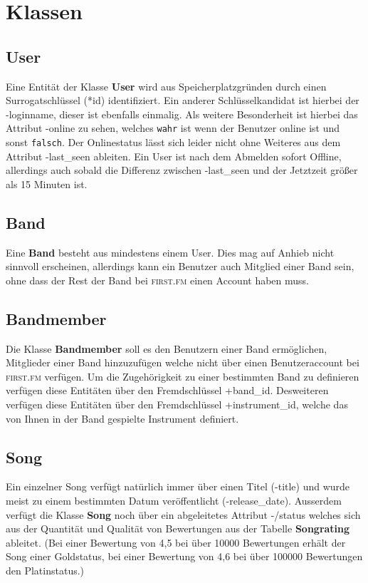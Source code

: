 \documentclass[11pt,a4paper,DIV=9]{scrartcl}
\begin{document}
\section{Klassen}
  \subsection{User}
    Eine Entität der Klasse \textbf{User} wird aus Speicherplatzgründen durch einen Surrogatschlüssel (*id) identifiziert. Ein anderer Schlüsselkandidat ist hierbei der -loginname, dieser ist ebenfalls einmalig. Als weitere Besonderheit ist hierbei das Attribut -online zu sehen, welches \texttt{wahr} ist wenn der Benutzer online ist und sonst \texttt{falsch}. Der Onlinestatus lässt sich leider nicht ohne Weiteres aus dem Attribut -last\_seen ableiten. Ein User ist nach dem Abmelden sofort Offline, allerdings auch sobald die Differenz zwischen -last\_seen und der Jetztzeit größer als 15 Minuten ist.
  \subsection{Band}
    Eine \textbf{Band} besteht aus mindestens einem User. Dies mag auf Anhieb nicht sinnvoll erscheinen, allerdings kann ein Benutzer auch Mitglied einer Band sein, ohne dass der Rest der Band bei \textsc{first.fm} einen Account haben muss. 
  \subsection{Bandmember}
    Die Klasse \textbf{Bandmember} soll es den Benutzern einer Band ermöglichen, Mitglieder einer Band hinzuzufügen welche nicht über einen Benutzeraccount bei \textsc{first.fm} verfügen. Um die Zugehörigkeit zu einer bestimmten Band zu definieren verfügen diese Entitäten über den Fremdschlüssel +band\_id. Desweiteren verfügen diese Entitäten über den Fremdschlüssel +instrument\_id, welche das von Ihnen in der Band gespielte Instrument definiert.
  \subsection{Song}
    Ein einzelner Song verfügt natürlich immer über einen Titel (-title) und wurde meist zu einem bestimmten Datum veröffentlicht (-release\_date). Ausserdem verfügt die Klasse \textbf{Song} noch über ein abgeleitetes Attribut -/status welches sich aus der Quantität und Qualität von Bewertungen aus der Tabelle \textbf{Songrating} ableitet. (Bei einer Bewertung von 4,5 bei \"uber 10000 Bewertungen erh\"alt der Song einer Goldstatus, bei einer Bewertung von 4,6 bei \"uber 100000 Bewertungen den Platinstatus.) 
\end{document}
